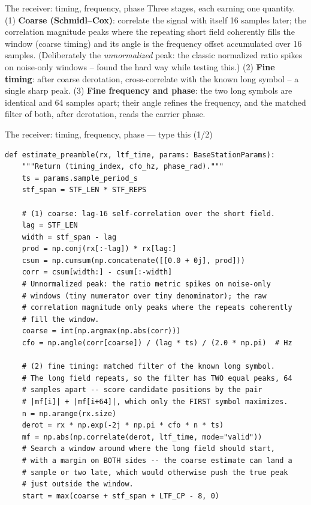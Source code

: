 \documentclass[10pt]{beamer}
\begin{document}
\begin{frame}{The receiver: timing, frequency, phase}
  Three stages, each earning one quantity. (1)
  \textbf{Coarse (Schmidl--Cox)}: correlate the signal with
  itself 16 samples later; the correlation magnitude peaks
  where the repeating short field coherently fills the
  window (coarse timing) and its angle is the frequency
  offset accumulated over 16 samples. (Deliberately the
  \emph{unnormalized} peak: the classic normalized ratio
  spikes on noise-only windows -- found the hard way while
  testing this.) (2) \textbf{Fine timing}: after coarse
  derotation, cross-correlate with the known long symbol --
  a single sharp peak. (3) \textbf{Fine frequency and
  phase}: the two long symbols are identical and 64 samples
  apart; their angle refines the frequency, and the matched
  filter of both, after derotation, reads the carrier
  phase.
\end{frame}

\begin{frame}[fragile]{The receiver: timing, frequency, phase --- type this (1/2)}
\begin{lstlisting}[basicstyle=\ttfamily\tiny]
def estimate_preamble(rx, ltf_time, params: BaseStationParams):
    """Return (timing_index, cfo_hz, phase_rad)."""
    ts = params.sample_period_s
    stf_span = STF_LEN * STF_REPS

    # (1) coarse: lag-16 self-correlation over the short field.
    lag = STF_LEN
    width = stf_span - lag
    prod = np.conj(rx[:-lag]) * rx[lag:]
    csum = np.cumsum(np.concatenate([[0.0 + 0j], prod]))
    corr = csum[width:] - csum[:-width]
    # Unnormalized peak: the ratio metric spikes on noise-only
    # windows (tiny numerator over tiny denominator); the raw
    # correlation magnitude only peaks where the repeats coherently
    # fill the window.
    coarse = int(np.argmax(np.abs(corr)))
    cfo = np.angle(corr[coarse]) / (lag * ts) / (2.0 * np.pi)  # Hz

    # (2) fine timing: matched filter of the known long symbol.
    # The long field repeats, so the filter has TWO equal peaks, 64
    # samples apart -- score candidate positions by the pair
    # |mf[i]| + |mf[i+64]|, which only the FIRST symbol maximizes.
    n = np.arange(rx.size)
    derot = rx * np.exp(-2j * np.pi * cfo * n * ts)
    mf = np.abs(np.correlate(derot, ltf_time, mode="valid"))
    # Search a window around where the long field should start,
    # with a margin on BOTH sides -- the coarse estimate can land a
    # sample or two late, which would otherwise push the true peak
    # just outside the window.
    start = max(coarse + stf_span + LTF_CP - 8, 0)
\end{lstlisting}
\end{frame}
\end{document}
